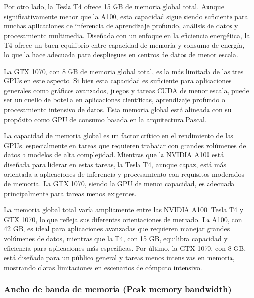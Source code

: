 \documentclass{article}
\begin{document}
			Por otro lado, la Tesla T4 ofrece 15 GB de memoria global total. Aunque significativamente menor que la A100, esta capacidad sigue siendo suficiente para muchas aplicaciones de inferencia de aprendizaje profundo, análisis de datos y procesamiento multimedia. Diseñada con un enfoque en la eficiencia energética, la T4 ofrece un buen equilibrio entre capacidad de memoria y consumo de energía, lo que la hace adecuada para despliegues en centros de datos de menor escala.

			La GTX 1070, con 8 GB de memoria global total, es la más limitada de las tres GPUs en este aspecto. Si bien esta capacidad es suficiente para aplicaciones generales como gráficos avanzados, juegos y tareas CUDA de menor escala, puede ser un cuello de botella en aplicaciones científicas, aprendizaje profundo o procesamiento intensivo de datos. Esta memoria global está alineada con su propósito como GPU de consumo basada en la arquitectura Pascal.

			La capacidad de memoria global es un factor crítico en el rendimiento de las GPUs, especialmente en tareas que requieren trabajar con grandes volúmenes de datos o modelos de alta complejidad. Mientras que la NVIDIA A100 está diseñada para liderar en estas tareas, la Tesla T4, aunque capaz, está más orientada a aplicaciones de inferencia y procesamiento con requisitos moderados de memoria. La GTX 1070, siendo la GPU de menor capacidad, es adecuada principalmente para tareas menos exigentes.

			La memoria global total varía ampliamente entre las NVIDIA A100, Tesla T4 y GTX 1070, lo que refleja sus diferentes orientaciones de mercado. La A100, con 42 GB, es ideal para aplicaciones avanzadas que requieren manejar grandes volúmenes de datos, mientras que la T4, con 15 GB, equilibra capacidad y eficiencia para aplicaciones más específicas. Por último, la GTX 1070, con 8 GB, está diseñada para un público general y tareas menos intensivas en memoria, mostrando claras limitaciones en escenarios de cómputo intensivo.

		\subsubsection{Ancho de banda de memoria (Peak memory bandwidth)}
\end{document}
